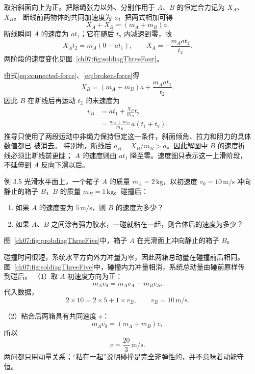 \begin{xesolution}
取沿斜面向上为正。把除绳张力以外、分别作用于 $A$、$B$ 的恒定合力记为 $X_A$、$X_B$。
断线前两物体的共同加速度为 $a$，把两式相加可得
\begin{equation}\label{eq:connected-force}
 X_A+X_B=(m_A+m_B)a.
\end{equation}
断线瞬间 $A$ 的速度为 $at_1$；它在随后 $t_2$ 内减速到零，故
\begin{equation}\label{eq:broken-force}
 X_A t_2=m_A(0-at_1),
 \qquad
 X_A=-\frac{m_Aat_1}{t_2}.
\end{equation}
两阶段的速度变化见图~\ref{ch07:fig:soldiagThreeFour}。

\soldiagThreeFour
由式\eqref{eq:connected-force}、\eqref{eq:broken-force}得
\[
 X_B=(m_A+m_B)a+\frac{m_Aat_1}{t_2}.
\]
因此 $B$ 在断线后再运动 $t_2$ 的末速度为
\begin{align*}
 v_B&=at_1+\frac{X_B}{m_B}t_2\\
 &=\boxed{\frac{m_A+m_B}{m_B}\,a(t_1+t_2)}.
\end{align*}
推导只使用了两段运动中非绳力保持恒定这一条件，斜面倾角、拉力和阻力的具体数值都已
被消去。
特别地，断线后 $a_B=X_B/m_B>a$。因此解图中 $B$ 的速度折线必须比断线前更陡；
$A$ 的速度则由 $at_1$ 降至零。速度图只表示这一上滑阶段，不延伸到 $A$ 反向下滑以后。
\end{xesolution}

\Needspace{0.28\textheight}
\begin{origexamplebox}{例 3.5}
光滑水平面上，一个箱子 $A$ 的质量 $m_A=2\,\mathrm{kg}$，以初速度
$v_0=10\,\mathrm{m/s}$ 冲向静止的箱子 $B$，$B$ 的质量 $m_B=1\,\mathrm{kg}$。碰撞后：
\begin{enumerate}[label=\arabic*.,leftmargin=2.2em]
 \item 如果 $A$ 的速度变为 $5\,\mathrm{m/s}$，则 $B$ 的速度为多少？
 \item 如果 $A$、$B$ 之间涂有强力胶水，一碰就粘在一起，则合体后的速度为多少？
\end{enumerate}
图~\ref{ch07:fig:probdiagThreeFive}中，箱子 $A$ 在光滑面上冲向静止的箱子 $B$。
\probdiagThreeFive
\end{origexamplebox}

\begin{xesolution}
碰撞时间很短，系统水平方向外力冲量为零，因此两箱总动量在碰撞前后相同。
图~\ref{ch07:fig:soldiagThreeFive}中，碰撞内力冲量相消，系统总动量由碰前原样传到碰后。
\soldiagThreeFive
（1）取 $A$ 初速度方向为正：
\[
 m_Av_0=m_Av_A+m_Bv_B.
\]
代入数据，
\[
 2\times10=2\times5+1\times v_B,
 \qquad
 \boxed{v_B=10\,\mathrm{m/s}}.
\]

（2）粘合后两箱具有共同速度 $v$：
\[
 m_Av_0=(m_A+m_B)v,
\]
所以
\[
 \boxed{v=\frac{20}{3}\,\mathrm{m/s}}.
\]
两问都只用动量关系；“粘在一起”说明碰撞是完全非弹性的，并不意味着动能守恒。
\end{xesolution}

